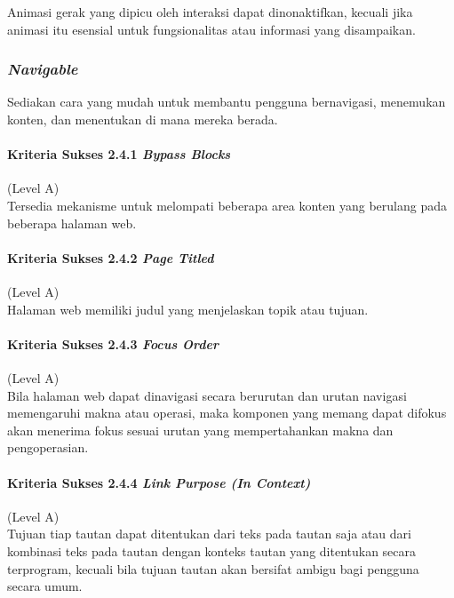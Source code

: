Animasi gerak yang dipicu oleh interaksi dapat dinonaktifkan, kecuali jika animasi itu esensial untuk fungsionalitas atau informasi yang disampaikan.

\subsubsection{\textit{Navigable}}
\label{sec:navigable}
Sediakan cara yang mudah untuk membantu pengguna bernavigasi, menemukan konten, dan menentukan di mana mereka berada.

\paragraph{Kriteria Sukses 2.4.1 \textit{Bypass Blocks}}
\label{sec:kriteria_sukses_2.4.1}
(Level A)\\

Tersedia mekanisme untuk melompati beberapa area konten yang berulang pada beberapa halaman web.

\paragraph{Kriteria Sukses 2.4.2 \textit{Page Titled}}
\label{sec:kriteria_sukses_2.4.2}
(Level A)\\

Halaman web memiliki judul yang menjelaskan topik atau tujuan.

\paragraph{Kriteria Sukses 2.4.3 \textit{Focus Order}}
\label{sec:kriteria_sukses_2.4.3}
(Level A)\\

Bila halaman web dapat dinavigasi secara berurutan dan urutan navigasi memengaruhi makna atau operasi, maka komponen yang memang dapat difokus akan menerima fokus sesuai urutan yang mempertahankan makna dan pengoperasian.

\paragraph{Kriteria Sukses 2.4.4 \textit{Link Purpose (In Context)}}
\label{sec:kriteria_sukses_2.4.4}
(Level A)\\

Tujuan tiap tautan dapat ditentukan dari teks pada tautan saja atau dari kombinasi teks pada tautan dengan konteks tautan yang ditentukan secara terprogram, kecuali bila tujuan tautan akan bersifat ambigu bagi pengguna secara umum.


